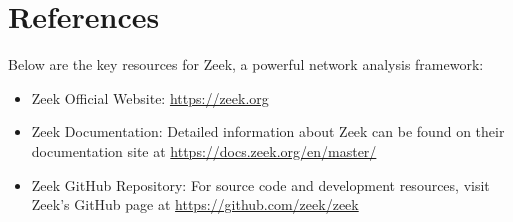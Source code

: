 \documentclass{article}
\begin{document}
\tableofcontents
















\section{References}
Below are the key resources for Zeek, a powerful network analysis framework:\\
\begin{itemize}
   

 \item  Zeek Official Website: \href{https://zeek.org}{https://zeek.org}\\

 \item  Zeek Documentation: Detailed information about Zeek can be found on their documentation site at \href{https://docs.zeek.org/en/master/}{https://docs.zeek.org/en/master/}\\

 \item  Zeek GitHub Repository: For source code and development resources, visit Zeek's GitHub page at \href{https://github.com/zeek/zeek}{https://github.com/zeek/zeek}\\


\end{itemize}
\end{document}
